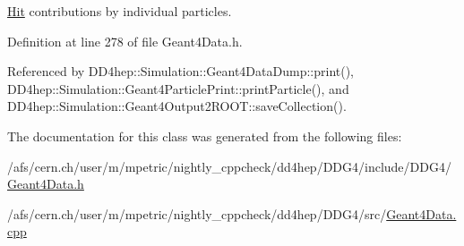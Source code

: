 \hyperlink{class_d_d4hep_1_1_simulation_1_1_geant4_calorimeter_1_1_hit}{Hit} contributions by individual particles. 



Definition at line 278 of file Geant4\+Data.\+h.



Referenced by D\+D4hep\+::\+Simulation\+::\+Geant4\+Data\+Dump\+::print(), D\+D4hep\+::\+Simulation\+::\+Geant4\+Particle\+Print\+::print\+Particle(), and D\+D4hep\+::\+Simulation\+::\+Geant4\+Output2\+R\+O\+O\+T\+::save\+Collection().



The documentation for this class was generated from the following files\+:\begin{DoxyCompactItemize}
\item 
/afs/cern.\+ch/user/m/mpetric/nightly\+\_\+cppcheck/dd4hep/\+D\+D\+G4/include/\+D\+D\+G4/\hyperlink{_geant4_data_8h}{Geant4\+Data.\+h}\item 
/afs/cern.\+ch/user/m/mpetric/nightly\+\_\+cppcheck/dd4hep/\+D\+D\+G4/src/\hyperlink{_geant4_data_8cpp}{Geant4\+Data.\+cpp}\end{DoxyCompactItemize}

